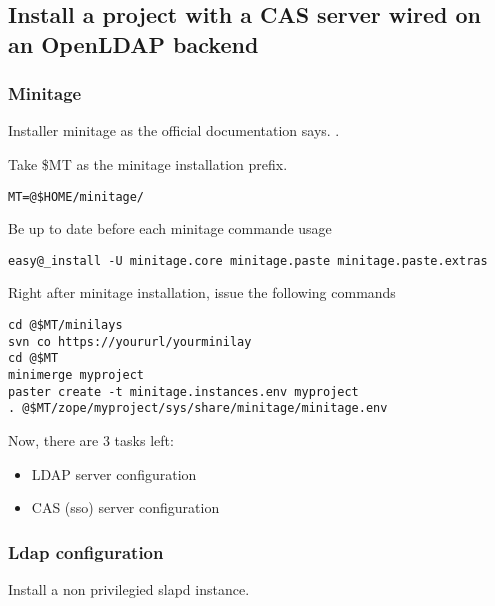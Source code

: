 \documentclass[letterpaper,10pt,english]{sphinxmanual}
\begin{document}
\subsection{Install a project with a CAS server wired on an OpenLDAP backend}
\label{usecases/deploying_a_cas_server::doc}\label{usecases/deploying_a_cas_server:install-a-project-with-a-cas-server-wired-on-an-openldap-backend}

\subsubsection{Minitage}
\label{usecases/deploying_a_cas_server:minitage}
Installer minitage as the official documentation says. .

Take \$MT as the minitage installation prefix.

\begin{Verbatim}[commandchars=@\[\]]
MT=@$HOME/minitage/
\end{Verbatim}

Be up to date before each minitage commande usage

\begin{Verbatim}[commandchars=@\[\]]
easy@_install -U minitage.core minitage.paste minitage.paste.extras
\end{Verbatim}

Right after minitage installation, issue the following commands

\begin{Verbatim}[commandchars=@\[\]]
cd @$MT/minilays
svn co https://yoururl/yourminilay
cd @$MT
minimerge myproject
paster create -t minitage.instances.env myproject
. @$MT/zope/myproject/sys/share/minitage/minitage.env
\end{Verbatim}

Now, there are 3 tasks left:
\begin{itemize}
\item {} 
LDAP server configuration

\item {} 
CAS (sso) server configuration

\end{itemize}


\subsubsection{Ldap configuration}
\label{usecases/deploying_a_cas_server:ldap-configuration}
Install a non privilegied slapd instance.
\end{document}
